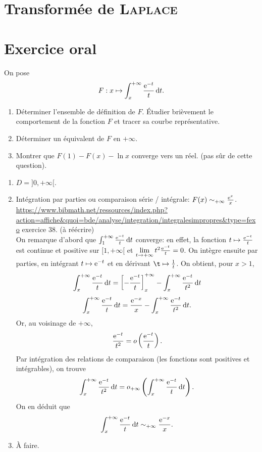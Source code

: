 \section{Transformée de \textsc{Laplace}} 
\label{transformee_laplace}



\section{Exercice oral}
\begin{exercice}
    On pose
    $$F:x \mapsto \int_x^{+\infty} \frac{\mathrm{e}^{-t}}{t} \, \mathrm{d} t.$$
    \begin{enumerate}
        \item Déterminer l'ensemble de définition de $F$. Étudier brièvement le comportement de la fonction $F$ et tracer sa courbe représentative.
        \item Déterminer un  équivalent de $F$ en $+\infty$.
        \item Montrer que $F(1) - F(x) - \ln x$ converge vers un réel. (pas sûr de cette question).
    \end{enumerate}
\end{exercice}

    \begin{enumerate}
        \item $D = ]0, + \infty[$.
        \item Intégration par parties ou comparaison série / intégrale: $F(x) \sim_{+\infty} \frac{\mathrm{e}^{x}}{x}$. \\
        \url{https://www.bibmath.net/ressources/index.php?action=affiche&quoi=bde/analyse/integration/integralesimpropres&type=fexo} exercice 38. (à réécrire)\\
        On remarque d'abord que $\int_{1}^{+\infty} \frac{\mathrm{e}^{-t}}{t} \, \mathrm{d} t$ converge: en effet, la fonction $t \mapsto \frac{\mathrm{e}^{-t}}{t}$ est continue et positive sur $[1, + \infty[$ et $\lim\limits_{t \to +\infty} t^2 \frac{\mathrm{e}^{-t}}{t} = 0$. On intègre ensuite par parties, en intégrant $t \mapsto \mathrm{e}^{-t}$ et en dérivant $\t \mapsto \frac{1}{t}$. On obtient, pour $x > 1$, 
        $$
            \int_x^{+ \infty} \frac{\mathrm{e}^{-t}}{t} \, \mathrm{d} t = \left[ -\frac{\mathrm{e}^{-t}}{t} \right]_x^{+\infty} - \int_x^{+\infty} \frac{\mathrm{e}^{-t}}{t^2} \, \mathrm{d} t
        $$
        $$
            \int_x^{+ \infty} \frac{\mathrm{e}^{-t}}{t} \, \mathrm{d} t= \frac{\mathrm{e}^{-x}}{x} - \int_x^{+\infty} \frac{\mathrm{e}^{-t}}{t^2} \, \mathrm{d} t.
        $$
        Or, au voisinage de $+ \infty$, 
        $$\frac{\mathrm{e}^{-t}}{t^2} = o\left( \frac{\mathrm{e}^{-t}}{t} \right).$$
        Par intégration des relations de comparaison (les fonctions sont positives et intégrables), on trouve
        $$\int_x^{+\infty} \frac{\mathrm{e}^{-t}}{t^2} \, \mathrm{d} t = o_{+\infty} \left( \int_x^{+\infty} \frac{\mathrm{e}^{-t}}{t} \, \mathrm{d} t \right).$$
        On en déduit que
        $$\int_x^{+\infty} \frac{\mathrm{e}^{-t}}{t} \, \mathrm{d} t \sim_{+\infty} \frac{\mathrm{e}^{-x}}{x}.$$
        \item À faire.
    \end{enumerate}
